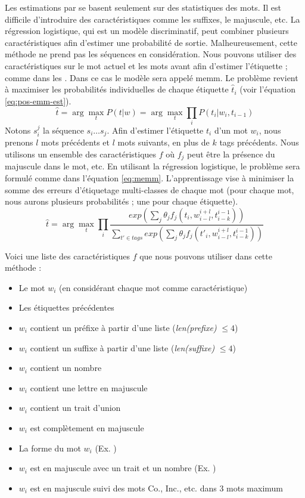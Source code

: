 \documentclass{KodeBook}
\begin{document}
Les estimations par  se basent seulement sur des statistiques des mots. 
Il est difficile d'introduire des caractéristiques comme les suffixes, le majuscule, etc. 
La régression logistique, qui est un modèle discriminatif, peut combiner plusieurs caractéristiques afin d'estimer une probabilité de sortie. 
Malheureusement, cette méthode ne prend pas les séquences en considération.
Nous pouvons utiliser des caractéristiques sur le mot actuel et les mots avant afin d'estimer l'étiquette ; comme dans les .
Dans ce cas le modèle sera appelé \acf{memm}.
Le problème revient à maximiser les probabilités individuelles de chaque étiquette $\hat{t}_i$ (voir l'équation \ref{eq:pos-emm-est}). 
\begin{equation}\label{eq:pos-emm-est}
\hat{t} = \arg\max\limits_t P(t | w) = \arg\max\limits_t \prod\limits_{i}  P(t_i | w_i, t_{i-1})
\end{equation}
Notons $s_i^j$ la séquence $s_i \ldots s_j$. 
Afin d'estimer l'étiquette $t_i$ d'un mot $w_i$, nous prenons $l$ mots précédents et $l$ mots suivants, en plus de $k$ tags précédents.
Nous utilisons un ensemble des caractéristiques $f$ où $f_j$ peut être la présence du majuscule dans le mot, etc.
En utilisant la régression logistique, le problème sera formulé comme dans l'équation \ref{eq:memm}.
L'apprentissage vise à minimiser la somme des erreurs d'étiquetage multi-classes de chaque mot (pour chaque mot, nous aurons plusieurs probabilités ; une pour chaque étiquette).
\begin{equation}\label{eq:memm}
\hat{t} = \arg\max\limits_t \prod\limits_{i}  
\frac{exp\left(\sum_j \theta_j f_j(t_i, w_{i-l}^{i+l}, t_{i-k}^{i-1})\right)}%
{\sum_{t' \in tags} exp\left(\sum_j \theta_j f_j(t'_i, w_{i-l}^{i+l}, t_{i-k}^{i-1})\right)}
\end{equation}

Voici une liste des caractéristiques $f$ que nous pouvons utiliser dans cette méthode :
\begin{itemize}
	\item Le mot $w_i$ (en considérant chaque mot comme caractéristique)
	\item Les étiquettes précédentes 
	\item $w_i$ contient un préfixe à partir d'une liste (\textit{len(prefixe)} $\le 4$) 
	\item $w_i$ contient un suffixe à partir d'une liste (\textit{len(suffixe)} $\le 4$) 
	\item $w_i$ contient un nombre 
	\item $w_i$ contient une lettre en majuscule
	\item $w_i$ contient un trait d'union 
	\item $w_i$ est complètement en majuscule
	\item La forme du mot $w_i$ (Ex. ) 
	\item $w_i$ est en majuscule avec un trait et un nombre (Ex. ) 
	\item $w_i$ est en majuscule suivi des mots Co., Inc., etc. dans 3 mots maximum
\end{itemize}
\end{document}
